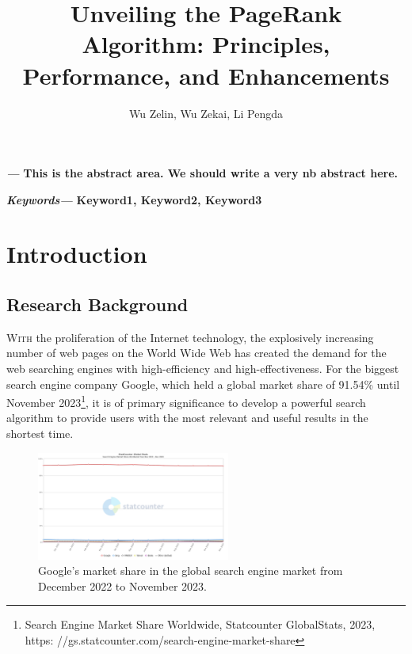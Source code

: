\documentclass[lettersize,journal,12pt,conference]{IEEEtran}
\renewenvironment{abstract}
{\fontsize{12}{14}\textit{\textbf{\abstractname---}}\bfseries\ignorespaces}
{}
\renewenvironment{IEEEkeywords}
{\fontsize{12}{14}\textit{\textbf{Keywords---}}\bfseries\ignorespaces}{}
\begin{document}
\onehalfspacing
\title{Unveiling the PageRank Algorithm: Principles, Performance, and Enhancements}
\author{Wu Zelin, Wu Zekai, Li Pengda}

\maketitle\thispagestyle{headings}
%

\begin{abstract}
	This is the abstract area. We should write a very nb abstract here.
\end{abstract}

\begin{IEEEkeywords}
	Keyword1, Keyword2, Keyword3
\end{IEEEkeywords}


\section{Introduction}

\subsection{Research Background}

\lettrine{W}{ith} 
the proliferation of the Internet technology, the explosively increasing number of web pages on the World Wide Web has created the demand for the web searching engines with high-efficiency and high-effectiveness. 
For the biggest search engine company Google, which held a global market share of 91.54\% until November 2023\footnote[1]{Search Engine Market Share Worldwide, Statcounter GlobalStats, 2023, https:
	//gs.statcounter.com/search-engine-market-share}, it is of primary significance to develop a powerful search algorithm to provide users with the most relevant and useful results in the shortest time.

\begin{figure}[h]
	\centering
	\includegraphics[width=2.5in]{images/fig2.png}
	\caption{Google's market share in the global search engine market from December 2022 to November 2023.}
	\label{fig1}
\end{figure}
\end{document}
